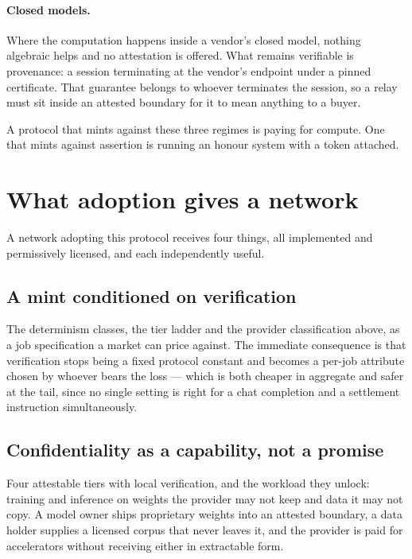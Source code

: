 \documentclass[11pt,a4paper]{article}
\begin{document}
\paragraph{Closed models.} Where the computation happens inside a vendor's
closed model, nothing algebraic helps and no attestation is offered. What remains
verifiable is provenance: a session terminating at the vendor's endpoint under a
pinned certificate. That guarantee belongs to whoever terminates the session, so
a relay must sit inside an attested boundary for it to mean anything to a buyer.

A protocol that mints against these three regimes is paying for compute. One that
mints against assertion is running an honour system with a token attached.

\section{What adoption gives a network}

A network adopting this protocol receives four things, all implemented and
permissively licensed, and each independently useful.

\subsection{A mint conditioned on verification}

The determinism classes, the tier ladder and the provider classification above,
as a job specification a market can price against. The immediate consequence is
that verification stops being a fixed protocol constant and becomes a per-job
attribute chosen by whoever bears the loss --- which is both cheaper in aggregate
and safer at the tail, since no single setting is right for a chat completion and
a settlement instruction simultaneously.

\subsection{Confidentiality as a capability, not a promise}

Four attestable tiers with local verification, and the workload they unlock:
training and inference on weights the provider may not keep and data it may not
copy. A model owner ships proprietary weights into an attested boundary, a data
holder supplies a licensed corpus that never leaves it, and the provider is paid
for accelerators without receiving either in extractable form.
\end{document}
